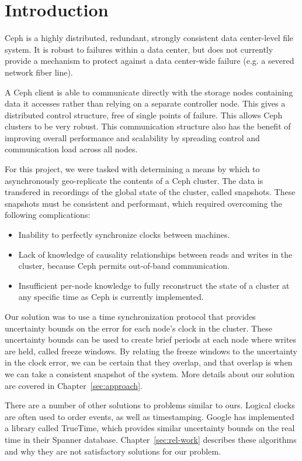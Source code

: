 \chapter{Introduction}
\label{sec:introduction}

Ceph is a highly distributed, redundant, strongly consistent data
center-level file system. It is robust to failures within a data
center, but does not currently provide a mechanism to protect against
a data center-wide failure (e.g. a severed network fiber line).

A Ceph client is able to communicate directly with the storage nodes
containing data it accesses rather than relying on a separate
controller node. This gives a distributed control structure, free of
single points of failure. This allows Ceph clusters to be very
robust. This communication structure also has the benefit of improving
overall performance and scalability by spreading control and
communication load across all nodes.

For this project, we were tasked with determining a means by which to
asynchronously geo-replicate the contents of a Ceph cluster. The data is 
transfered in recordings of the global state of the cluster, called snapshots.
These snapshots must be consistent and performant, which required overcoming 
the following complications:

\begin{itemize}
\item Inability to perfectly synchronize clocks between machines.
\item Lack of knowledge of causality relationships between reads and
  writes in the cluster, because Ceph permits out-of-band
  communication.
\item Insufficient per-node knowledge to fully reconstruct the state
  of a cluster at any specific time as Ceph is currently implemented.
\end{itemize}

Our solution was to use a time synchronization protocol that provides
uncertainty bounds on the error for each node's clock in the cluster. These
uncertainty bounds can be used to create brief periods at each node where writes are 
held, called freeze windows. By relating the freeze windows to the uncertainty 
in the clock error, we can be certain that they overlap, and that overlap
is when we can take a consistent snapshot of the system. More details
about our solution are covered in Chapter~\ref{sec:approach}.

There are a number of other solutions to problems similar to
ours. Logical clocks are often used to order events, as well as
timestamping. Google has implemented a library called TrueTime, which
provides similar uncertainty bounds on the real time in their Spanner
database. Chapter~\ref{sec:rel-work} describes these algorithms and
why they are not satisfactory solutions for our problem.

